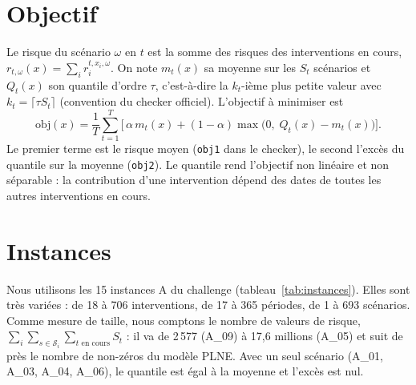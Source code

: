 \documentclass[11pt,a4paper]{report}
\newcommand{\Sd}{\mathcal{S}}
\newcommand{\obj}{\mathrm{obj}}
\begin{document}
\section{Objectif}

Le risque du scénario $\omega$ en $t$ est la somme des risques des interventions en cours,
$r_{t,\omega}(x) = \sum_{i} r_i^{t, x_i, \omega}$. On note $m_t(x)$ sa moyenne sur les $S_t$ scénarios
et $Q_t(x)$ son quantile d'ordre $\tau$, c'est-à-dire la $k_t$-ième plus petite valeur avec
$k_t = \lceil \tau S_t \rceil$ (convention du checker officiel). L'objectif à minimiser est
\[
  \obj(x) = \frac{1}{T} \sum_{t=1}^{T} \Big[\, \alpha \, m_t(x) + (1 - \alpha) \max\big(0,\; Q_t(x) - m_t(x)\big) \Big].
\]
Le premier terme est le risque moyen (\texttt{obj1} dans le checker), le second l'excès du
quantile sur la moyenne (\texttt{obj2}). Le quantile rend l'objectif non linéaire et non séparable :
la contribution d'une intervention dépend des dates de toutes les autres interventions en cours.

\section{Instances}

Nous utilisons les 15 instances A du challenge (tableau~\ref{tab:instances}). Elles sont très
variées : de 18 à 706 interventions, de 17 à 365 périodes, de 1 à 693 scénarios. Comme mesure de
taille, nous comptons le nombre de valeurs de risque, $\sum_i \sum_{s \in \Sd_i} \sum_{t \text{ en cours}} S_t$ :
il va de 2\,577 (A\_09) à 17,6 millions (A\_05) et suit de près le nombre de non-zéros du modèle PLNE.
Avec un seul scénario (A\_01, A\_03, A\_04, A\_06), le quantile est égal à la moyenne et l'excès est nul.
\end{document}
